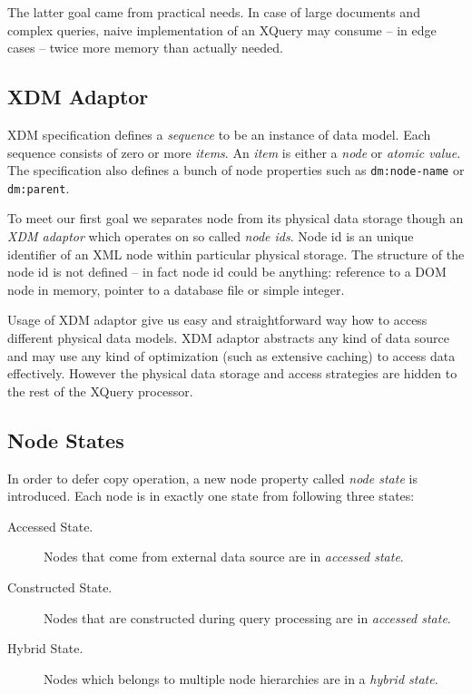 \documentclass{llncs}
\begin{document}
The latter goal came from practical needs. In case of large documents
and complex queries, naive implementation of an XQuery may consume 
-- in edge cases -- twice more memory than actually needed.

\subsection{XDM Adaptor}

XDM specification defines
a \emph{sequence} to be an instance of data model. Each sequence consists of
zero or more \emph{items}. An \emph{item} is either a \emph{node} or 
\emph{atomic value}. The specification also defines a bunch of node properties
such as \texttt{dm:node-name} or \texttt{dm:parent}.

To meet our first goal we separates node from its physical data storage
though an \emph{XDM adaptor} which operates on so called \emph{node ids}.
Node id is an unique identifier
of an XML node within particular physical storage. The structure of the
node id is not defined -- in fact node id could be anything: reference to a 
DOM node in memory, pointer to a database
file or simple integer. 

Usage of XDM adaptor give us easy and straightforward way how
to access different physical data models. 
XDM adaptor abstracts any kind of data source and may use any kind of
optimization (such as extensive caching) to access data effectively. 
However the physical data storage and access strategies are hidden to
the rest of the XQuery processor.


\subsection{Node States}

In order to defer copy operation, a new node property called \emph{node state}
is introduced. Each node is in exactly one state from following three states:

\begin{description}
    \item[Accessed State.] 
        Nodes that come from external data source are in \emph{accessed state}. 

    \item[Constructed State.]
        Nodes that are constructed during query processing are 
        in \emph{accessed state}. 
    
    \item[Hybrid State.]
        Nodes which belongs to multiple node hierarchies are in a 
        \emph{hybrid state}.
\end{description}
\end{document}
